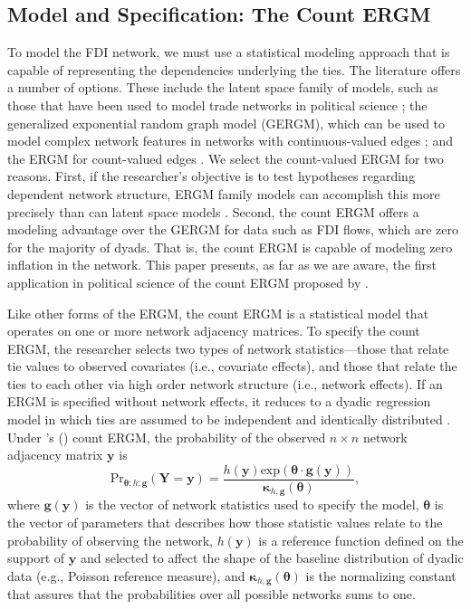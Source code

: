 \documentclass[reqno,onecolumn,letterpaper,12pt]{article}
\newcommand\citeapos[1]{\citeauthor{#1}'s (\citeyear{#1})}
\begin{document}
\subsection{Model and Specification: The Count ERGM}

To model the FDI network, we must use a statistical modeling approach that is capable of representing the dependencies underlying the ties. The literature offers a number of options. These include the latent space family of models, such as those that have been used to model trade networks in political science \citep{ward2007persistent,ward2013gravity}; the generalized exponential random graph model (GERGM), which can be used to model complex network features in networks with continuous-valued edges \citep{desmarais2012statistical,wilson2017stochastic}; and the ERGM for count-valued edges \citep{krivitsky2012exponential}. We select the count-valued ERGM for two reasons. First, if the researcher's objective is to test hypotheses regarding dependent network structure, ERGM family models can accomplish this more precisely than can latent space models \citep{cranmer2016navigating,cranmer2016critique,desmarais2017statistical}. Second, the count ERGM offers a modeling advantage over the GERGM for data such as FDI flows, which are zero for the majority of dyads. That is, the count ERGM is capable of modeling zero inflation in the network. This paper presents, as far as we are aware, the first application in political science of the count ERGM proposed by \cite{krivitsky2012exponential}.

Like other forms of the ERGM, the count ERGM is a statistical model that operates on one or more network adjacency matrices. To specify the count ERGM, the researcher selects two types of network statistics---those that relate tie values to observed covariates (i.e., covariate effects), and those that relate the ties to each other via high order network structure (i.e., network effects). If an ERGM is specified without network effects, it reduces to a dyadic regression model in which ties are assumed to be independent and identically distributed \citep{cranmer2011inferential}. Under \citeapos{krivitsky2012exponential} count ERGM, the probability of the observed $n \times n$ network adjacency matrix $\bm{y}$ is $$ \text{Pr}_{\bm{\theta};h;\bm{g}}( \bm{Y}=\bm{y} )=\frac{ h(\bm{y})\text{exp}( \bm {\theta} \cdot \bm{g} (\bm{y}) )}{\bm{\kappa}_{h,\bm{g}}(\bm{\theta})},$$ where $\bm{g}( \bm{y} )$ is the vector of network statistics used to specify the model, $\bm{\theta}$ is the vector of parameters that describes how those statistic values relate to the probability of observing the network, $h(\bm{y})$ is a reference function defined on the support of $\bm{y}$ and selected to affect the shape of the baseline distribution of dyadic data (e.g., Poisson reference measure), and $\bm{\kappa}_{h,\bm{g}}(\bm{\theta})$ is the normalizing constant that assures that the probabilities over all possible networks sums to one.
\end{document}
